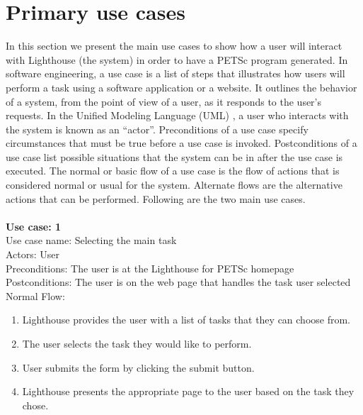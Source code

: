 \section{Primary use cases}

In this section we present the main use cases to show how a user will interact with Lighthouse (the system) in order to have a PETSc program generated. In software engineering, a use case is a list of steps that illustrates how users will perform a task using a software application or a website. It outlines the behavior of a system, from the point of view of a user, as it responds to the user's requests. In the Unified Modeling Language (UML) \cite{uml}, a user who interacts with the system is known as an ``actor''. Preconditions of a use case specify circumstances that must be true before a use case is invoked. Postconditions of a use case list possible situations that the system can be in after the use case is executed. The normal or basic flow of a use case is the flow of actions that is considered normal or usual for the system. Alternate flows are the alternative actions that can be performed. Following are the two main use cases.\\
\\ 
\textbf{Use case: 1}\\
Use case name: Selecting the main task\\
Actors: User\\
Preconditions: The user is at the Lighthouse for PETSc homepage\\
Postconditions: The user is on the web page that handles the task user selected\\
Normal Flow:
\begin{enumerate}
  \item Lighthouse provides the user with a list of tasks that they can choose from. 
  \item The user selects the task they would like to perform. 
  \item User submits the form by clicking the submit button. 
  \item Lighthouse presents the appropriate page to the user based on the task they chose.\\
\end{enumerate}

